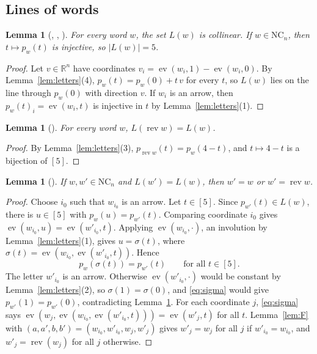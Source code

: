 \documentclass[11pt]{amsart}
\theoremstyle{plain}
\newtheorem{lemma}[theorem]{Lemma}
\theoremstyle{definition}
\newcommand{\R}{\mathbb{R}}
\newcommand{\ev}{\operatorname{ev}}
\newcommand{\rev}{\operatorname{rev}}
\newcommand{\NC}{\mathrm{NC}}
\begin{document}
\subsection{Lines of words}

\begin{lemma}[, , ]\label{lem:line}
For every word $w$, the set $L(w)$ is collinear. If $w\in\NC_n$, then $t\mapsto p_w(t)$ is injective, so $|L(w)|=5$.
\end{lemma}

\begin{proof}
Let $v\in\R^n$ have coordinates $v_i=\ev(w_i,1)-\ev(w_i,0)$. By Lemma~\ref{lem:letters}(4), $p_w(t)=p_w(0)+t\,v$ for every $t$, so $L(w)$ lies on the line through $p_w(0)$ with direction $v$.
If $w_i$ is an arrow, then $p_w(t)_i=\ev(w_i,t)$ is injective in $t$ by Lemma~\ref{lem:letters}(1).
\end{proof}

\begin{lemma}[]\label{lem:rev}
For every word $w$, $L(\rev w)=L(w)$.
\end{lemma}

\begin{proof}
By Lemma~\ref{lem:letters}(3), $p_{\rev w}(t)=p_w(4-t)$, and $t\mapsto4-t$ is a bijection of $[5]$.
\end{proof}

\begin{lemma}[]\label{lem:lineeq}
If $w,w'\in\NC_n$ and $L(w')=L(w)$, then $w'=w$ or $w'=\rev w$.
\end{lemma}

\begin{proof}
Choose $i_0$ such that $w_{i_0}$ is an arrow. Let $t\in[5]$. Since $p_{w'}(t)\in L(w)$, there is $u\in[5]$ with $p_w(u)=p_{w'}(t)$. Comparing coordinate $i_0$ gives $\ev(w_{i_0},u)=\ev(w'_{i_0},t)$. Applying $\ev(w_{i_0},\cdot)$, an involution by Lemma~\ref{lem:letters}(1), gives $u=\sigma(t)$, where $\sigma(t)=\ev(w_{i_0},\ev(w'_{i_0},t))$. Hence
\begin{equation}\label{eq:sigma}
  p_w(\sigma(t))=p_{w'}(t)\qquad\text{for all }t\in[5].
\end{equation}
The letter $w'_{i_0}$ is an arrow. Otherwise $\ev(w'_{i_0},\cdot)$ would be constant by Lemma~\ref{lem:letters}(2), so $\sigma(1)=\sigma(0)$, and \eqref{eq:sigma} would give $p_{w'}(1)=p_{w'}(0)$, contradicting Lemma~\ref{lem:line}.
For each coordinate $j$, \eqref{eq:sigma} says $\ev(w_j,\ev(w_{i_0},\ev(w'_{i_0},t)))=\ev(w'_j,t)$ for all $t$. Lemma~\ref{lem:F} with $(a,a',b,b')=(w_{i_0},w'_{i_0},w_j,w'_j)$ gives $w'_j=w_j$ for all $j$ if $w'_{i_0}=w_{i_0}$, and $w'_j=\rev(w_j)$ for all $j$ otherwise.
\end{proof}
\end{document}
